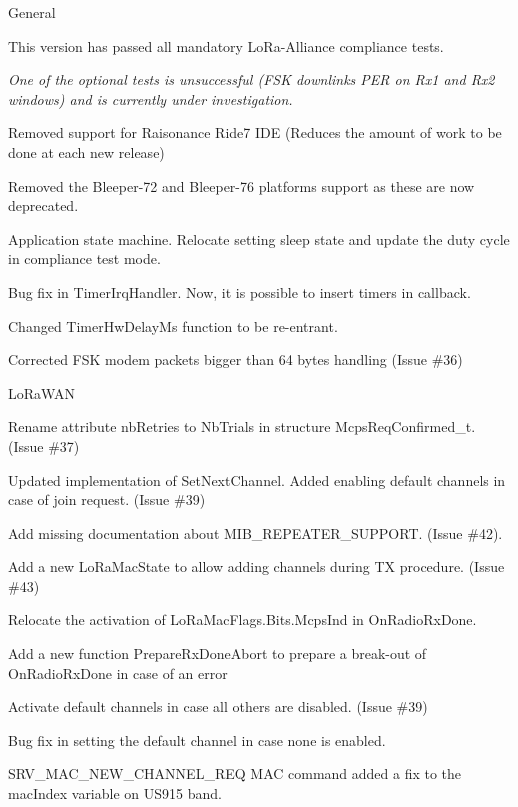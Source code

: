 \begin{DoxyItemize}
\item General
\begin{DoxyEnumerate}
\item This version has passed all mandatory Lo\+Ra-\/\+Alliance compliance tests.

{\itshape One of the optional tests is unsuccessful (F\+SK downlinks P\+ER on Rx1 and Rx2 windows) and is currently under investigation.}
\item Removed support for Raisonance Ride7 I\+DE (Reduces the amount of work to be done at each new release)
\item Removed the Bleeper-\/72 and Bleeper-\/76 platforms support as these are now deprecated.
\item Application state machine. Relocate setting sleep state and update the duty cycle in compliance test mode.
\item Bug fix in Timer\+Irq\+Handler. Now, it is possible to insert timers in callback.
\item Changed Timer\+Hw\+Delay\+Ms function to be re-\/entrant.
\item Corrected F\+SK modem packets bigger than 64 bytes handling (Issue \#36)
\end{DoxyEnumerate}
\item Lo\+Ra\+W\+AN
\begin{DoxyEnumerate}
\item Rename attribute nb\+Retries to Nb\+Trials in structure Mcps\+Req\+Confirmed\+\_\+t. (Issue \#37)
\item Updated implementation of Set\+Next\+Channel. Added enabling default channels in case of join request. (Issue \#39)
\item Add missing documentation about M\+I\+B\+\_\+\+R\+E\+P\+E\+A\+T\+E\+R\+\_\+\+S\+U\+P\+P\+O\+RT. (Issue \#42).
\item Add a new Lo\+Ra\+Mac\+State to allow adding channels during TX procedure. (Issue \#43)
\item Relocate the activation of Lo\+Ra\+Mac\+Flags.\+Bits.\+Mcps\+Ind in On\+Radio\+Rx\+Done.
\item Add a new function Prepare\+Rx\+Done\+Abort to prepare a break-\/out of On\+Radio\+Rx\+Done in case of an error
\item Activate default channels in case all others are disabled. (Issue \#39)
\item Bug fix in setting the default channel in case none is enabled.
\item S\+R\+V\+\_\+\+M\+A\+C\+\_\+\+N\+E\+W\+\_\+\+C\+H\+A\+N\+N\+E\+L\+\_\+\+R\+EQ M\+AC command added a fix to the mac\+Index variable on U\+S915 band.

\end{DoxyEnumerate}
\end{DoxyItemize}
